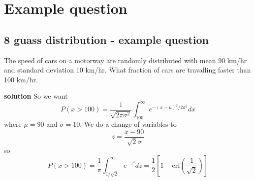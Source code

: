 
\ifind
\section*{Example question}
\else
\subsection*{8 guass distribution - example question}
\fi

The speed of cars on a motorway are randomly distributed with mean 90
km/hr and standard deviation 10 km/hr. What fraction of cars are
travalling faster than 100 km/hr.


\noindent \textbf{solution} So we want
\begin{equation}
P(x>100)=\frac{1}{\sqrt{2\pi\sigma^2}}\int_{100}^\infty e^{-(x-\mu)^2/2\sigma^2}dx 
\end{equation}
where $\mu=90$ and $\sigma=10$. We do a change of variables to
\begin{equation}
z=\frac{x-90}{\sqrt{2}\sigma}
\end{equation}
so
\begin{equation}
P(x>100)=\frac{1}{\pi}\int_{1/\sqrt{2}}^{\infty}e^{-z^2}dz=\frac{1}{2}\left[1-\mbox{erf}\left({\frac{1}{\sqrt{2}}}\right)\right]
\end{equation}
